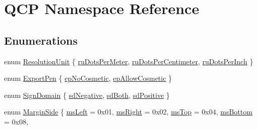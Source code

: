 \hypertarget{namespace_q_c_p}{}\section{Q\+CP Namespace Reference}
\label{namespace_q_c_p}
\subsection*{Enumerations}
\begin{DoxyCompactItemize}
\item 
enum \mbox{\hyperlink{namespace_q_c_p_a715d46153da230990aa887d0f0602452}{Resolution\+Unit}} \{ \mbox{\hyperlink{namespace_q_c_p_a715d46153da230990aa887d0f0602452a707d005dea5c4ab694e4270d9c6094e8}{ru\+Dots\+Per\+Meter}}, 
\mbox{\hyperlink{namespace_q_c_p_a715d46153da230990aa887d0f0602452a4224e01f49b331489ad8cb12b619b229}{ru\+Dots\+Per\+Centimeter}}, 
\mbox{\hyperlink{namespace_q_c_p_a715d46153da230990aa887d0f0602452affb887d8efe79c39a1aca2acd7002afc}{ru\+Dots\+Per\+Inch}}
 \}
\item 
enum \mbox{\hyperlink{namespace_q_c_p_a17844f19e1019693a953e1eb93536d2f}{Export\+Pen}} \{ \mbox{\hyperlink{namespace_q_c_p_a17844f19e1019693a953e1eb93536d2faae8fcfaafee234ce18558afef83f6a78}{ep\+No\+Cosmetic}}, 
\mbox{\hyperlink{namespace_q_c_p_a17844f19e1019693a953e1eb93536d2fa50d3657dba3fb90560b93a823cb0a6e8}{ep\+Allow\+Cosmetic}}
 \}
\item 
enum \mbox{\hyperlink{namespace_q_c_p_afd50e7cf431af385614987d8553ff8a9}{Sign\+Domain}} \{ \mbox{\hyperlink{namespace_q_c_p_afd50e7cf431af385614987d8553ff8a9a2d18af0bc58f6528d1e82ce699fe4829}{sd\+Negative}}, 
\mbox{\hyperlink{namespace_q_c_p_afd50e7cf431af385614987d8553ff8a9aa38352ef02d51ddfa4399d9551566e24}{sd\+Both}}, 
\mbox{\hyperlink{namespace_q_c_p_afd50e7cf431af385614987d8553ff8a9a584784b75fb816abcc627cf743bb699f}{sd\+Positive}}
 \}
\item 
enum \mbox{\hyperlink{namespace_q_c_p_a7e487e3e2ccb62ab7771065bab7cae54}{Margin\+Side}} \{ \newline
\mbox{\hyperlink{namespace_q_c_p_a7e487e3e2ccb62ab7771065bab7cae54a9500c8bfcc9e80b9dff0a8e00e867f07}{ms\+Left}} = 0x01, 
\mbox{\hyperlink{namespace_q_c_p_a7e487e3e2ccb62ab7771065bab7cae54a93c719593bb2b94ed244d52c86d83b65}{ms\+Right}} = 0x02, 
\mbox{\hyperlink{namespace_q_c_p_a7e487e3e2ccb62ab7771065bab7cae54a5db8fb0d0b0ecf0d611c2602a348e8a0}{ms\+Top}} = 0x04, 
\mbox{\hyperlink{namespace_q_c_p_a7e487e3e2ccb62ab7771065bab7cae54a5241d8eac2bab9524a38889f576179cc}{ms\+Bottom}} = 0x08, 
\newline

\end{DoxyCompactItemize}
